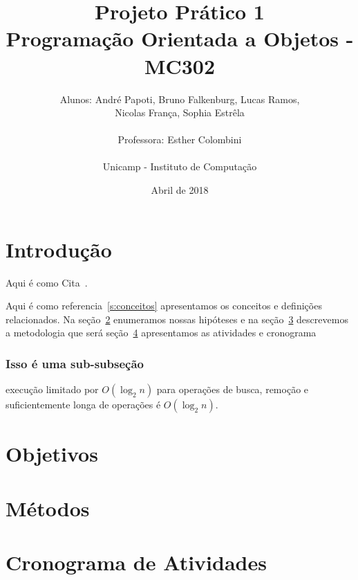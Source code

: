 \documentclass[a4paper,11pt,fleqn]{article}
\title{Projeto Prático 1\\
Programação Orientada a Objetos - MC302}
\author{Alunos: André Papoti, Bruno Falkenburg, Lucas Ramos, \\
Nicolas França, Sophia Estrêla\\\\
Professora: Esther Colombini\\\\
Unicamp - Instituto de Computação\\}
\date{Abril de 2018}
\begin{document}
\maketitle


\section{Introdução}



Aqui é como Cita~\cite{pfaff2004,pfaff2004full}.

Aqui é como referencia~\ref{s:conceitos} apresentamos os conceitos e definições
relacionados.  Na seção~\ref{s:questoes-hipoteses} enumeramos nossas
hipóteses e na seção~\ref{s:metodos} descrevemos a metodologia que será
seção~\ref{s:atividades-cronograma} apresentamos as atividades e cronograma









\subsubsection{Isso é uma sub-subseção}
\label{p:splay-tree}

execução limitado por $O(\log_2 n)$ para operações de busca, remoção e
suficientemente longa de operações é $O(\log_2 n)$.




\section{Objetivos}
\label{s:questoes-hipoteses}


\section{Métodos}
\label{s:metodos}




\section{Cronograma de Atividades}
\label{s:atividades-cronograma}
\end{document}
